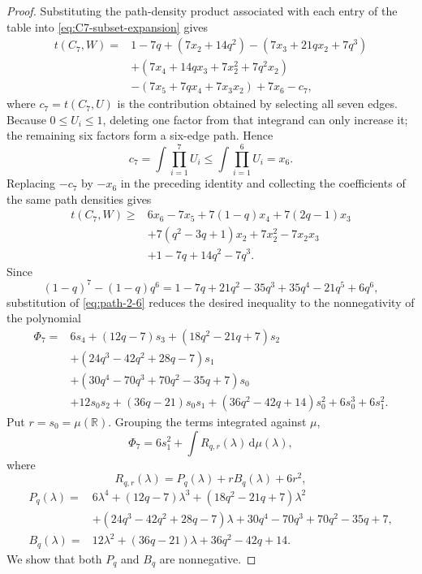 \documentclass[11pt]{article}
\newcommand{\R}{\mathbb R}
\newcommand{\dd}{\,\mathrm d}
\begin{document}
\begin{proof}
Substituting the path-density product associated with each entry of the
table into \eqref{eq:C7-subset-expansion} gives
\begin{align*}
 t(C_7,W)={}&1-7q
 +(7x_2+14q^2)
 -(7x_3+21qx_2+7q^3)\\
 &+(7x_4+14qx_3+7x_2^2+7q^2x_2)\\
 &-(7x_5+7qx_4+7x_3x_2)
 +7x_6-c_7,
\end{align*}
where \(c_7=t(C_7,U)\) is the contribution obtained by selecting all seven
edges.  Because \(0\le U_i\le1\), deleting one factor from that integrand
can only increase it; the remaining six factors form a six-edge path.
Hence
\[
       c_7=\int\prod_{i=1}^7U_i
       \le\int\prod_{i=1}^6U_i=x_6.
\]
Replacing \(-c_7\) by \(-x_6\) in the preceding identity and collecting the
coefficients of the same path densities gives
\begin{equation}\label{eq:C7-IE}
\begin{aligned}
 t(C_7,W)\ge{}&6x_6-7x_5+7(1-q)x_4+7(2q-1)x_3\\
 &+7(q^2-3q+1)x_2+7x_2^2-7x_2x_3\\
 &+1-7q+14q^2-7q^3.
\end{aligned}
\end{equation}
Since
\[
 (1-q)^7-(1-q)q^6
 =1-7q+21q^2-35q^3+35q^4-21q^5+6q^6,
\]
substitution of \eqref{eq:path-2-6} reduces the desired inequality to the nonnegativity of the polynomial
\begin{equation}\label{eq:Phi7-expanded}
\begin{aligned}
 \Phi_7={}&6s_4+(12q-7)s_3+(18q^2-21q+7)s_2\\
 &+(24q^3-42q^2+28q-7)s_1\\
 &+(30q^4-70q^3+70q^2-35q+7)s_0\\
 &+12s_0s_2+(36q-21)s_0s_1
 +(36q^2-42q+14)s_0^2+6s_0^3+6s_1^2.
\end{aligned}
\end{equation}
Put \(r=s_0=\mu(\R)\).  Grouping the terms integrated against \(\mu\),
\begin{equation}\label{eq:Phi7-integral}
       \Phi_7=6s_1^2+\int R_{q,r}(\lambda)\dd\mu(\lambda),
\end{equation}
where
\[
       R_{q,r}(\lambda)=P_q(\lambda)+rB_q(\lambda)+6r^2,
\]
\begin{align*}
 P_q(\lambda)={}&6\lambda^4+(12q-7)\lambda^3
 +(18q^2-21q+7)\lambda^2\\
 &+(24q^3-42q^2+28q-7)\lambda
 +30q^4-70q^3+70q^2-35q+7,\\
 B_q(\lambda)={}&12\lambda^2+(36q-21)\lambda+36q^2-42q+14.
\end{align*}
We show that both \(P_q\) and \(B_q\) are nonnegative.


\end{proof}
\end{document}
